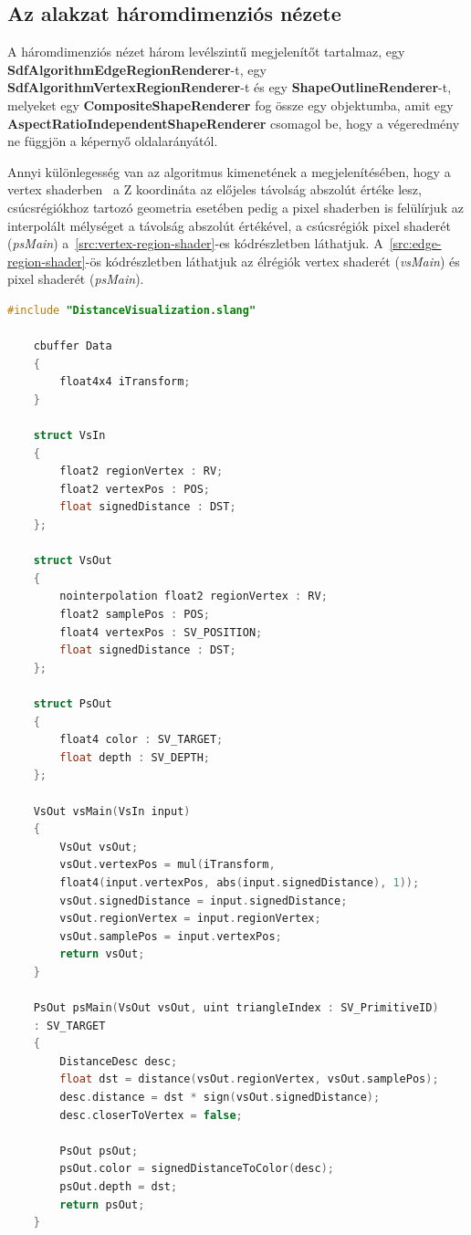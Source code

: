 \subsection{Az alakzat háromdimenziós nézete}

A háromdimenziós nézet három levélszintű megjelenítőt tartalmaz, egy \textbf{SdfAlgorithmEdgeRegionRenderer}-t, egy \textbf{SdfAlgorithmVertexRegionRenderer}-t és egy \textbf{ShapeOutlineRenderer}-t, melyeket egy \textbf{CompositeShapeRenderer} fog össze egy objektumba, amit egy \textbf{AspectRatioIndependentShapeRenderer} csomagol be, hogy a végeredmény ne függjön a képernyő oldalarányától.

Annyi különlegesség van az algoritmus kimenetének a megjelenítésében, hogy a vertex shaderben~\cite{vertexshader} a Z koordináta az előjeles távolság abszolút értéke lesz, csúcsrégiókhoz tartozó geometria esetében pedig a pixel shaderben is felülírjuk az interpolált mélységet a távolság abszolút értékével, a csúcsrégiók pixel shaderét~\cite{pixelshader} (\textit{psMain}) a~\ref{src:vertex-region-shader}-es kódrészletben láthatjuk. A~\ref{src:edge-region-shader}-ös kódrészletben láthatjuk az élrégiók vertex shaderét (\textit{vsMain}) és pixel shaderét (\textit{psMain}).

\begin{lstlisting}[language=c]
	#include "DistanceVisualization.slang"

	cbuffer Data
	{
		float4x4 iTransform;
	}

	struct VsIn
	{
		float2 regionVertex : RV;
		float2 vertexPos : POS;
		float signedDistance : DST;
	};

	struct VsOut
	{
		nointerpolation float2 regionVertex : RV;
		float2 samplePos : POS;
		float4 vertexPos : SV_POSITION;
		float signedDistance : DST;
	};

	struct PsOut
	{
		float4 color : SV_TARGET;
		float depth : SV_DEPTH;
	};

	VsOut vsMain(VsIn input)
	{
		VsOut vsOut;
		vsOut.vertexPos = mul(iTransform,
		float4(input.vertexPos, abs(input.signedDistance), 1));
		vsOut.signedDistance = input.signedDistance;
		vsOut.regionVertex = input.regionVertex;
		vsOut.samplePos = input.vertexPos;
		return vsOut;
	}

	PsOut psMain(VsOut vsOut, uint triangleIndex : SV_PrimitiveID)
	: SV_TARGET
	{
		DistanceDesc desc;
		float dst = distance(vsOut.regionVertex, vsOut.samplePos);
		desc.distance = dst * sign(vsOut.signedDistance);
		desc.closerToVertex = false;

		PsOut psOut;
		psOut.color = signedDistanceToColor(desc);
		psOut.depth = dst;
		return psOut;
	}
\end{lstlisting}


